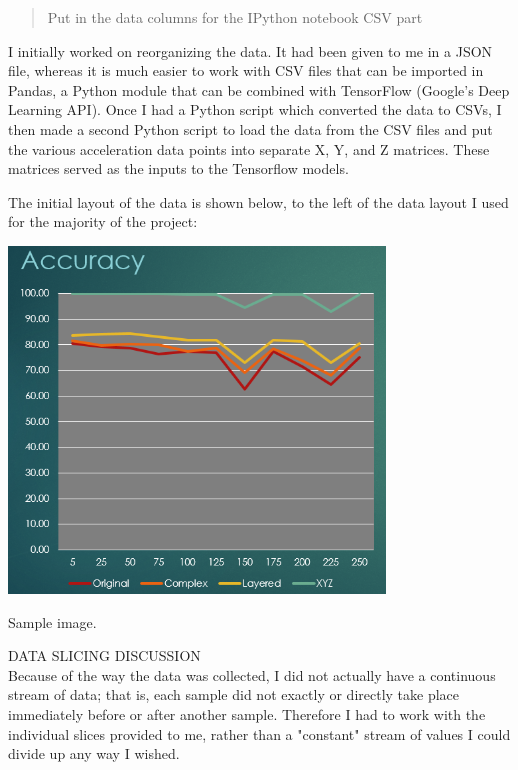 \documentclass[]{report}
\begin{document}
\begin{quote}
Put in the data columns for the IPython notebook CSV part
\end{quote}

I initially worked on reorganizing the data. It had been given to me in a JSON file, whereas it is much easier to work with CSV files that can be imported in Pandas, a Python module that can be combined with TensorFlow (Google's Deep Learning API). Once I had a Python script which converted the data to CSVs, I then made a second Python script to load the data from the CSV files and put the various acceleration data points into separate X, Y, and Z matrices. These matrices served as the inputs to the Tensorflow models.

The initial layout of the data is shown below, to the left of the data layout I used for the majority of the project:\\
\begin{minipage}{\linewidth}
	\begin{minipage}{0.49\textwidth}
		\centering
		\includegraphics[width=0.75\textwidth]{accuracy}
	\end{minipage}
	\hfill
	
	\begin{minipage}{0.49\textwidth}
		\centering
		Sample image.
	\end{minipage}
\end{minipage}

DATA SLICING DISCUSSION\\
Because of the way the data was collected, I did not actually have a continuous stream of data; that is, each sample did not exactly or directly take place immediately before or after another sample. Therefore I had to work with the individual slices provided to me, rather than a "constant" stream of values I could divide up any way I wished.
\end{document}
